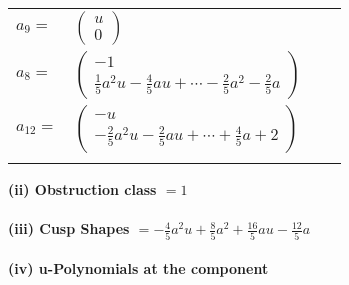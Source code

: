 \documentclass[1p]{elsarticle_modified}
\theoremstyle{definition}
\begin{document}
\begin{tabular}{m{7pt} m{180pt} m{7pt} m{180pt} }
\flushright $a_{9}=$&$\begin{pmatrix}u\\0\end{pmatrix}$ \\
\flushright $a_{8}=$&$\begin{pmatrix}-1\\\frac{1}{5} a^2 u-\frac{4}{5} a u+\cdots-\frac{2}{5} a^2-\frac{2}{5} a\end{pmatrix}$ \\
\flushright $a_{12}=$&$\begin{pmatrix}- u\\-\frac{2}{5} a^2 u-\frac{2}{5} a u+\cdots+\frac{4}{5} a+2\end{pmatrix}$\\&\end{tabular}
\flushleft \textbf{(ii) Obstruction class $= 1$}\\~\\
\flushleft \textbf{(iii) Cusp Shapes $= -\frac{4}{5} a^2 u+\frac{8}{5} a^2+\frac{16}{5} a u-\frac{12}{5} a$}\\~\\
\newpage\renewcommand{\arraystretch}{1}
\flushleft \textbf{(iv) u-Polynomials at the component}\newline \\
\end{document}
